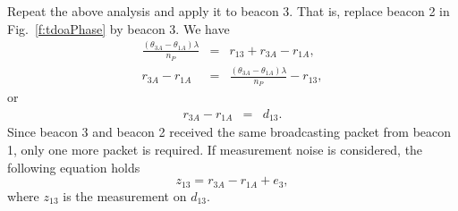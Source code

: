 Repeat the above analysis and apply it to beacon 3. That is, replace beacon 2 in Fig.~\ref{f:tdoaPhase} by beacon 3. We have
\begin{eqnarray*}
  \frac{(\theta_{3A}-\theta_{1A})\lambda}{n_P} &=& r_{13}+r_{3A}-r_{1A}, \\
  r_{3A}-r_{1A} &=& \frac{(\theta_{3A}-\theta_{1A})\lambda}{n_P} - r_{13},
\end{eqnarray*}
or
\begin{eqnarray*}
  r_{3A}-r_{1A} &=& d_{13}.
\end{eqnarray*}
Since beacon 3 and beacon 2 received the same broadcasting packet from beacon 1, only one more packet is required. If measurement noise is considered, the following equation holds
$$ z_{13} =  r_{3A}-r_{1A} +e_3, $$
where $z_{13}$ is the measurement on $d_{13}$.

